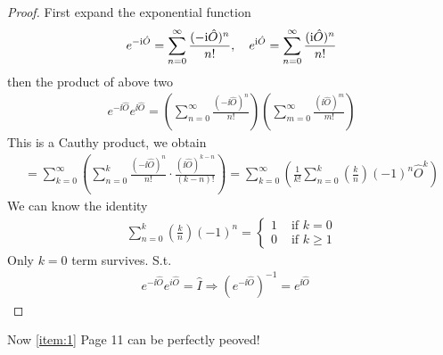 \begin{proof}
    First expand the exponential function 
    \begin{eqnarray*}
        e^{-\mathrm{i} \hat{O}}=\sum_{n=0}^{\infty} \frac{(-\mathrm{i} \hat{O})^n}{n!}, \quad e^{\mathrm{i} \hat{O}}=\sum_{n=0}^{\infty} \frac{(\mathrm{i} \hat{O})^n}{n!}
    \end{eqnarray*}
    then the product of above two
    \begin{eqnarray*}
        e^{-\ii \widehat{O}} e^{\ii \widehat{O}}=\left(\sum_{n=0}^{\infty} \frac{(-\ii \widehat{O})^n}{n!}\right)\left(\sum_{m=0}^{\infty} \frac{(\ii \widehat{O})^m}{m!}\right)
    \end{eqnarray*}
    This is a Cauthy product, we obtain 
    \begin{eqnarray*}
        =\sum_{k=0}^{\infty}\left(\sum_{n=0}^k \frac{(-\ii \widehat{O})^n}{n!} \cdot \frac{(\ii \widehat{O})^{k-n}}{(k-n)!}\right)=\sum_{k=0}^{\infty}\left(\frac{1}{k!} \sum_{n=0}^k\left(\frac{k}{n}\right)(-1)^n \widehat{O}^k\right)
    \end{eqnarray*}
    We can know the identity
    \begin{eqnarray*}
        \sum_{n=0}^k\left(\frac{k}{n}\right)(-1)^n= \begin{cases}1 & \text { if } k=0 \\ 0 & \text { if } k \geq 1\end{cases}
    \end{eqnarray*}
    Only $k=0$ term survives. S.t. 
    \begin{eqnarray*}
        e^{-\ii\hat{O}} e^{i\hat{O}} = \hat{I} \Rightarrow \left( e^{-\ii\hat{O}} \right)^{-1} = e^{\ii\hat{O}} \quad 
    \end{eqnarray*} 
\end{proof}
Now \cref{item:1} Page 11 can be perfectly peoved! 
